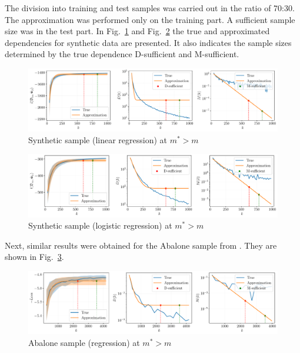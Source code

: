\documentclass[
11pt,%
tightenlines,%
twoside,%
onecolumn,%
nofloats,%
nobibnotes,%
nofootinbib,%
superscriptaddress,%
noshowpacs,%
centertags]%
{revtex4-2}
\begin{document}
The division into training and test samples was carried out in the ratio of 70:30. The approximation was performed only on the training part. A sufficient sample size was in the test part. In Fig.~\ref{synthetic-regression-approximation} and Fig.~\ref{synthetic-classification-approximation} the true and approximated dependencies for synthetic data are presented. It also indicates the sample sizes determined by the true dependence D-sufficient and M-sufficient. 

\begin{figure}[h!]
    \centering
    \includegraphics[width=\textwidth]{paper/figures/synthetic-regression-approximation.pdf}
    \caption{Synthetic sample (linear regression) at $m^*> m$}
    \label{synthetic-regression-approximation}
\end{figure}

\begin{figure}[h!]
    \centering
    \includegraphics[width=\textwidth]{paper/figures/synthetic-classification-approximation.pdf}
    \caption{Synthetic sample (logistic regression) at $m^*> m$}
    \label{synthetic-classification-approximation}
\end{figure}

Next, similar results were obtained for the Abalone sample from \citep{UCI}. They are shown in Fig.~\ref{abalone-approximation}.

\begin{figure}[h!]
    \centering
    \includegraphics[width=\textwidth]{paper/figures/abalone-approximation.pdf}
    \caption{Abalone sample (regression) at $m^* > m$}
    \label{abalone-approximation}
\end{figure}
\end{document}
